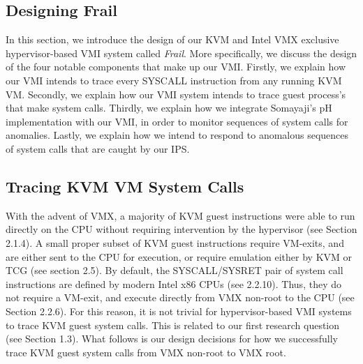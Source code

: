 \documentclass{report}
\begin{document}
\begin{spacing}{1.5}
\chapter{Designing Frail}

{\large
In this section, we introduce the design of our KVM and Intel VMX exclusive hypervisor-based VMI system called \textit{Frail}. More specifically, we discuss the design of the four notable components that make up our VMI. Firstly, we explain how our VMI intends to trace every SYSCALL instruction from any running KVM VM. Secondly, we explain how our VMI system intends to trace guest process's that make system calls. Thirdly, we explain how we integrate Somayaji's pH implementation with our VMI, in order to monitor sequences of system calls for anomalies. Lastly, we explain how we intend to respond to anomalous sequences of system calls that are caught by our IPS. 
\newline
}

\section{Tracing KVM VM System Calls}
{\large
With the advent of VMX, a majority of KVM guest instructions were able to run directly on the CPU without requiring intervention by the hypervisor (see Section 2.1.4). A small proper subset of KVM guest instructions require VM-exits, and are either sent to the CPU for execution, or require emulation either by KVM or TCG (see section 2.5). By default, the SYSCALL/SYSRET pair of system call instructions are defined by modern Intel x86 CPUs (see 2.2.10). Thus, they do not require a VM-exit, and execute directly from VMX non-root to the CPU (see Section 2.2.6). For this reason, it is not trivial for hypervisor-based VMI systems to trace KVM guest system calls. This is related to our first research question (see Section 1.3). What follows is our design decisions for how we successfully trace KVM guest system calls from VMX non-root to VMX root.
\newline
}



\end{spacing}
\end{document}
